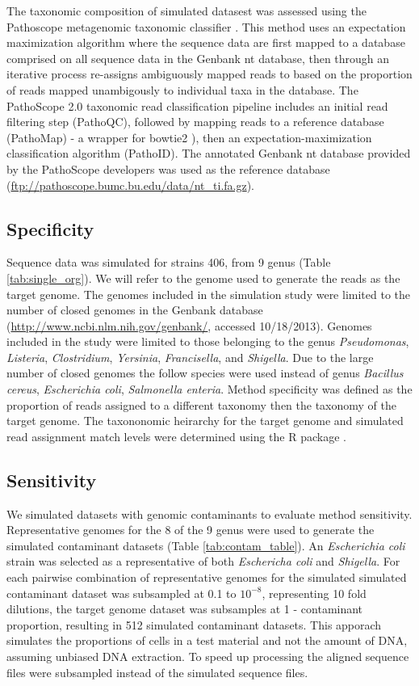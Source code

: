 \documentclass[fleqn,10pt,lineno]{wlpeerj}\usepackage[]{graphicx}\usepackage[]{color}
\begin{document}
The taxonomic composition of simulated datasest was assessed using the Pathoscope metagenomic taxonomic classifier \citep{Francis2013}. 
This method uses an expectation maximization algorithm where the sequence data are first mapped to a database comprised on all sequence data in the Genbank nt database, 
then through an iterative process re-assigns ambiguously mapped reads to based on the proportion of reads mapped unambigously to individual taxa in the database. 
The PathoScope 2.0 taxonomic read classification pipeline includes an initial read filtering step (PathoQC), 
followed by mapping reads to a reference database (PathoMap) - a wrapper for bowtie2 \citep{Langmead2012}), then an expectation-maximization classification algorithm (PathoID). 
The annotated Genbank nt database provided by the PathoScope developers was used as the reference database (\url{ftp://pathoscope.bumc.bu.edu/data/nt\_ti.fa.gz}).

\subsection*{Specificity} 
Sequence data was simulated for strains 406, from 9 genus (Table \ref{tab:single_org}). 
We will refer to the genome used to generate the reads as the target genome. 
The genomes included in the simulation study were limited to the number of closed genomes in the Genbank database (\url{http://www.ncbi.nlm.nih.gov/genbank/}, accessed 10/18/2013). 
Genomes included in the study were limited to those belonging to the genus \textit{Pseudomonas},
\textit{Listeria}, \textit{Clostridium}, \textit{Yersinia}, \textit{Francisella}, and \textit{Shigella}. 
Due to the large number of closed genomes the follow species were used instead of genus \textit{Bacillus cereus}, \textit{Escherichia coli}, \textit{Salmonella enteria}. 
Method specificity was defined as the proportion of reads assigned to a different taxonomy then the taxonomy of the target genome. 
The taxononomic heirarchy for the target genome and simulated read assignment match levels were determined using the R package \citep{TaxizeArticle,TaxizeManual}. 

\subsection*{Sensitivity}
We simulated datasets with genomic contaminants to evaluate method sensitivity. 
Representative genomes for the 8 of the 9 genus were used to generate the simulated contaminant datasets (Table \ref{tab:contam_table}). 
An \textit{Escherichia coli} strain was selected as a representative of both \textit{Eschericha coli} and \textit{Shigella}. 
For each pairwise combination of representative genomes for the simulated simulated contaminant dataset was subsampled at 0.1 to $10^{-8}$, representing 10 fold dilutions, the target genome dataset was subsamples at 1 - contaminant proportion, resulting in 512 simulated contaminant datasets. 
This apporach simulates the proportions of cells in a test material and not the amount of DNA, assuming unbiased DNA extraction. 
To speed up processing the aligned sequence files were subsampled instead of the simulated sequence files. 
\end{document}

